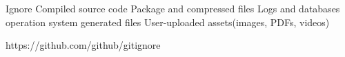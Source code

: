 Ignore 
  Compiled source code 
  Package and compressed files 
  Logs and databases 
  operation system generated files 
  User-uploaded assets(images, PDFs, videos)
  
  https://github.com/github/gitignore 